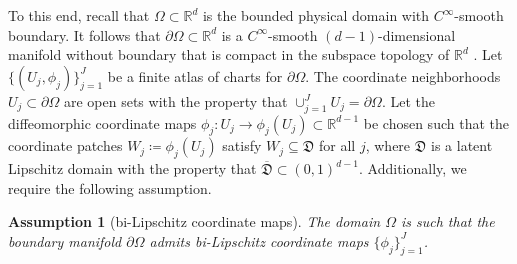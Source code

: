 \documentclass[pdflatex,sn-mathphys-num]{sn-jnl-preprint}
\newcommand{\R}{\mathbb{R}}
\newcommand{\pOmega}{{\partial\Omega}}
\newcommand{\defeq}{\coloneqq} %
\theoremstyle{thmstyleone}%
\theoremstyle{thmstyletwo}%
\theoremstyle{thmstylethree}%
\newtheorem{assumption}{Assumption}%
\numberwithin{equation}{section}
\numberwithin{theorem}{section}
\begin{document}
To this end, recall that $\Omega\subset\R^d$ is the bounded physical domain with $C^\infty$-smooth boundary. It follows that $\pOmega\subset\R^d $ is a $C^\infty$-smooth $(d-1)$-dimensional manifold without boundary that is compact in the subspace topology of $\R^d$ \cite{tu2011manifold}. Let $\{(U_j,\phi_j)\}_{j=1}^J$ be a finite atlas of charts for $\pOmega$. The coordinate neighborhoods $U_j\subset \pOmega$ are open sets with the property that $\cup_{j=1}^J U_j=\pOmega$. Let the diffeomorphic coordinate maps $\phi_j\colon U_j\to\phi_j(U_j)\subset\R^{d-1}$ be chosen such that the coordinate patches $W_j\defeq \phi_j(U_j)$ satisfy $W_j\subseteq \mathfrak{D}$ for all $j$, where $\mathfrak{D}$ is a latent Lipschitz domain with the property that $\overline{\mathfrak{D}}\subset (0,1)^{d-1}$.
Additionally, we require the following assumption.
\begin{assumption}[bi-Lipschitz coordinate maps]\label{ass:bilipschitz}
    The domain $\Omega$ is such that the boundary manifold $\pOmega$ admits bi-Lipschitz coordinate maps $\{\phi_j\}_{j=1}^J$.
\end{assumption}
\end{document}
